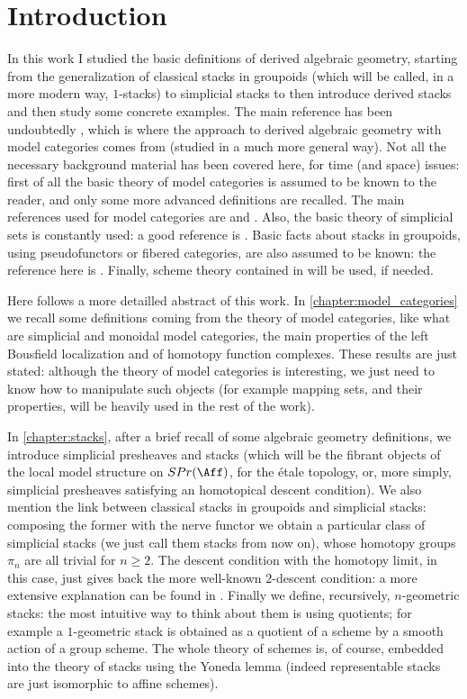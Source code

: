 \chapter{Introduction}
    In this work I studied the basic definitions of derived algebraic geometry, starting from the generalization of classical stacks in groupoids (which will be called, in a more modern way, $1$-stacks) to simplicial stacks to then introduce derived stacks and then study some concrete examples. The main reference has been undoubtedly \cite{ToVe:hag2}, which is where the approach to derived algebraic geometry with model categories comes from (studied in a much more general way).
    Not all the necessary background material has been covered here, for time (and space) issues: first of all the basic theory of model categories is assumed to be known to the reader, and only some more advanced definitions are recalled. The main references used for model categories are \cite{Hov:model} and \cite{Hirs:loc}. Also, the basic theory of simplicial sets is constantly used: a good reference is \cite{GoeJar:simpl_hom}. Basic facts about stacks in groupoids, using pseudofunctors or fibered categories, are also assumed to be known: the reference here is \cite{Vist:desc}. Finally, scheme theory contained in \cite{Hart} will be used, if needed.

    Here follows a more detailled abstract of this work. In \cref{chapter:model_categories} we recall some definitions coming from the theory of model categories, like what are simplicial and monoidal model categories, the main properties of the left Bousfield localization and of homotopy function complexes. These results are just stated: although the theory of model categories is interesting, we just need to know how to manipulate such objects (for example mapping sets, and their properties, will be heavily used in the rest of the work). 

    In \cref{chapter:stacks}, after a brief recall of some algebraic geometry definitions, we introduce simplicial presheaves and stacks (which will be the fibrant objects of the local model structure on $SPr(\Aff)$, for the étale topology, or, more simply, simplicial presheaves satisfying an homotopical descent condition). We also mention the link between classical stacks in groupoids and simplicial stacks: composing the former with the nerve functor we obtain a particular class of simplicial stacks (we just call them stacks from now on), whose homotopy groups $\pi_n$ are all trivial for $n \geq 2$. The descent condition with the homotopy limit, in this case, just gives back the more well-known $2$-descent condition: a more extensive explanation can be found in \cite{Hennion:memoire}. Finally we define, recursively, $n$-geometric stacks: the most intuitive way to think about them is using quotients; for example a $1$-geometric stack is obtained as a quotient of a scheme by a smooth action of a group scheme. The whole theory of schemes is, of course, embedded into the theory of stacks using the Yoneda lemma (indeed representable stacks are just isomorphic to affine schemes).

